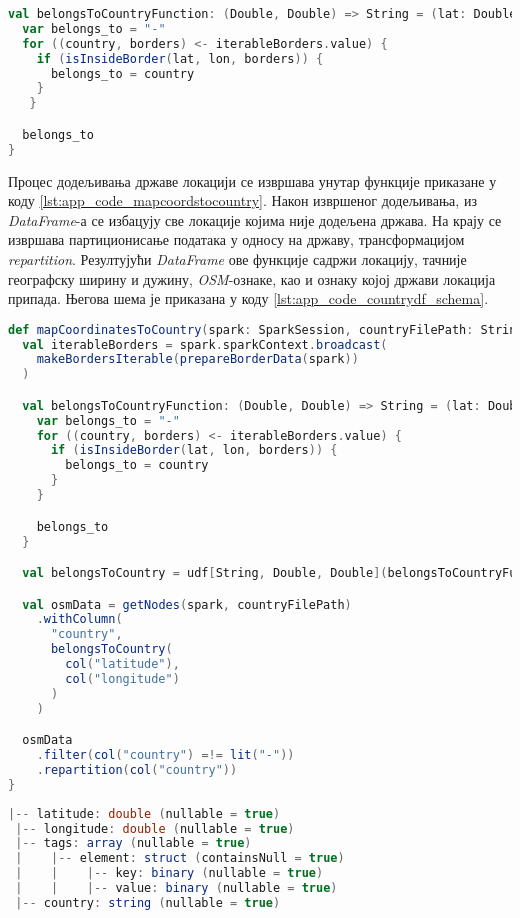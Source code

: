 \documentclass[12pt,oneside]{memoir}
\begin{document}
\begin{lstlisting}[caption={Функција која додељује државу локацији}, language=Scala, label={lst:app_code_belongstocountry}]
val belongsToCountryFunction: (Double, Double) => String = (lat: Double, lon: Double) => {
  var belongs_to = "-"
  for ((country, borders) <- iterableBorders.value) {
    if (isInsideBorder(lat, lon, borders)) {
      belongs_to = country
    }
   }

  belongs_to
}
\end{lstlisting}

Процес додељивања државе локацији се извршава унутар функције приказане у коду \ref{lst:app_code_mapcoordstocountry}. Након извршеног додељивања, из \textit{DataFrame}-а се избацују све локације којима није додељена држава. На крају се извршава партиционисање података у односу на државу, трансформацијом \textit{repartition}. Резултујући \textit{DataFrame} ове функције садржи локацију, тачније географску ширину и дужину, \textit{OSM}-ознаке, као и ознаку којој држави локација припада. Његова шема је приказана у коду \ref{lst:app_code_countrydf_schema}.

\begin{lstlisting}[caption={Функција \textit{mapCoordinatesToCountry}}, language=Scala, label={lst:app_code_mapcoordstocountry}]
def mapCoordinatesToCountry(spark: SparkSession, countryFilePath: String): DataFrame = {
  val iterableBorders = spark.sparkContext.broadcast(
    makeBordersIterable(prepareBorderData(spark))
  )

  val belongsToCountryFunction: (Double, Double) => String = (lat: Double, lon: Double) => {
    var belongs_to = "-"
    for ((country, borders) <- iterableBorders.value) {
      if (isInsideBorder(lat, lon, borders)) {
        belongs_to = country
      }
    }

    belongs_to
  }

  val belongsToCountry = udf[String, Double, Double](belongsToCountryFunction)

  val osmData = getNodes(spark, countryFilePath)
    .withColumn(
      "country",
      belongsToCountry(
        col("latitude"),
        col("longitude")
      )
    )

  osmData
    .filter(col("country") =!= lit("-"))
    .repartition(col("country"))
}
\end{lstlisting}

\begin{lstlisting}[caption={Шема \textit{DataFrame}-а након додељивања држава локацијама}, language=Scala, label={lst:app_code_countrydf_schema}]
 |-- latitude: double (nullable = true)
 |-- longitude: double (nullable = true)
 |-- tags: array (nullable = true)
 |    |-- element: struct (containsNull = true)
 |    |    |-- key: binary (nullable = true)
 |    |    |-- value: binary (nullable = true)
 |-- country: string (nullable = true)
\end{lstlisting}
\end{document}

